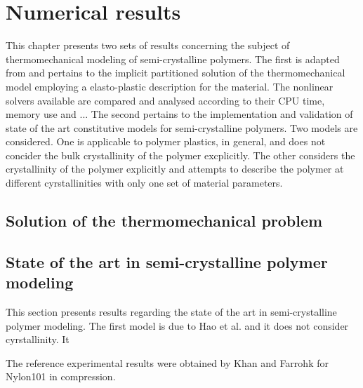 \chapter{Numerical results} \label{sec:numerical_results}

This chapter presents two sets of results concerning the subject of thermomechanical modeling of semi-crystalline polymers.
The first is adapted from \cite{vilacha} and pertains to the implicit partitioned solution of the thermomechanical model employing a elasto-plastic description for the material.
The nonlinear solvers available are compared and analysed according to their CPU time, memory use and ...
The second pertains to the implementation and validation of state of the art constitutive models for semi-crystalline polymers.
Two models are considered.
One is applicable to polymer plastics, in general, and does not concider the bulk crystallinity of the polymer excplicitly.
The other considers the crystallinity of the polymer explicitly and attempts to describe the polymer at different cyrstallinities with only one set of material parameters.


\section{Solution of the thermomechanical problem}


\section{State of the art in semi-crystalline polymer modeling}

This section presents results regarding the state of the art in semi-crystalline polymer modeling.
The first model is due to Hao et al. \citep{hao} and it does not consider cyrstallinity.
It

The reference experimental results were obtained by Khan and Farrohk \citep{khan} for Nylon101 in compression.



